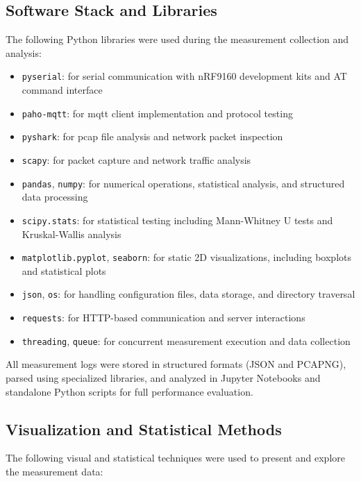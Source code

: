 \documentclass[12pt, english, openany]{book}
\begin{document}
\subsection*{Software Stack and Libraries}

The following Python libraries were used during the measurement collection and analysis:

\begin{itemize}
    \item \texttt{pyserial}: for serial communication with nRF9160 development kits and AT command interface
    \item \texttt{paho-mqtt}: for \gls{mqtt} client implementation and protocol testing
    \item \texttt{pyshark}: for \gls{pcap} file analysis and network packet inspection
    \item \texttt{scapy}: for packet capture and network traffic analysis
    \item \texttt{pandas}, \texttt{numpy}: for numerical operations, statistical analysis, and structured data processing
    \item \texttt{scipy.stats}: for statistical testing including Mann-Whitney U tests and Kruskal-Wallis analysis
    \item \texttt{matplotlib.pyplot}, \texttt{seaborn}: for static 2D visualizations, including boxplots and statistical plots
    \item \texttt{json}, \texttt{os}: for handling configuration files, data storage, and directory traversal
    \item \texttt{requests}: for HTTP-based communication and server interactions
    \item \texttt{threading}, \texttt{queue}: for concurrent measurement execution and data collection
\end{itemize}

All measurement logs were stored in structured formats (JSON and PCAPNG), parsed using specialized libraries, and analyzed in Jupyter Notebooks and standalone Python scripts for full performance evaluation.
\subsection*{Visualization and Statistical Methods}

The following visual and statistical techniques were used to present and explore the measurement data:
\end{document}
